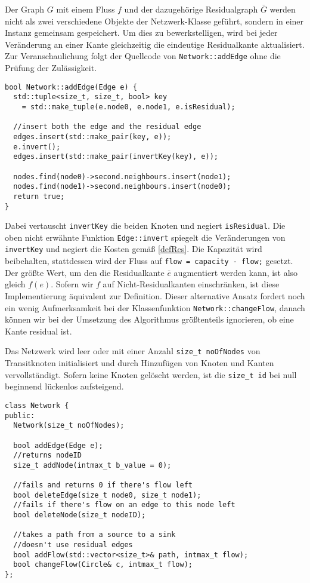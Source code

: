 Der Graph $G$ mit einem Fluss $f$ und der dazugehörige Residualgraph $\bar{G}$ werden nicht als zwei verschiedene Objekte der Netzwerk-Klasse geführt, sondern in einer Instanz gemeinsam gespeichert. Um dies zu bewerkstelligen, wird bei jeder Veränderung an einer Kante gleichzeitig die eindeutige Residualkante aktualisiert. Zur Veranschaulichung folgt der Quellcode von \lstinline|Network::addEdge| ohne die Prüfung der Zulässigkeit.

\begin{lstlisting}
bool Network::addEdge(Edge e) {
  std::tuple<size_t, size_t, bool> key
    = std::make_tuple(e.node0, e.node1, e.isResidual);

  //insert both the edge and the residual edge
  edges.insert(std::make_pair(key, e));
  e.invert();
  edges.insert(std::make_pair(invertKey(key), e));

  nodes.find(node0)->second.neighbours.insert(node1);
  nodes.find(node1)->second.neighbours.insert(node0);
  return true;
}
\end{lstlisting}

Dabei vertauscht \lstinline|invertKey| die beiden Knoten und negiert \lstinline|isResidual|. Die oben nicht erwähnte Funktion \lstinline|Edge::invert| spiegelt die Veränderungen von \lstinline|invertKey| und negiert die Kosten gemäß \cref{defRes}. Die Kapazität wird beibehalten, stattdessen wird der Fluss auf \lstinline|flow = capacity - flow;| gesetzt. Der größte Wert, um den die Residualkante $\bar{e}$ augmentiert werden kann, ist also gleich $f(e)$. Sofern wir $f$ auf Nicht-Residualkanten einschränken, ist diese Implementierung äquivalent zur Definition. Dieser alternative Ansatz fordert noch ein wenig Aufmerksamkeit bei der Klassenfunktion \lstinline|Network::changeFlow|,\footnotemark{} danach können wir bei der Umsetzung des Algorithmus größtenteils ignorieren, ob eine Kante residual ist.


Das Netzwerk wird leer oder mit einer Anzahl \lstinline|size_t noOfNodes| von Transitknoten initialisiert und durch Hinzufügen von Knoten und Kanten vervollständigt. Sofern keine Knoten gelöscht werden, ist die \lstinline|size_t id| bei null beginnend lückenlos aufsteigend.

\begin{lstlisting}
class Network {
public:
  Network(size_t noOfNodes);

  bool addEdge(Edge e);
  //returns nodeID
  size_t addNode(intmax_t b_value = 0);
  
  //fails and returns 0 if there's flow left
  bool deleteEdge(size_t node0, size_t node1);
  //fails if there's flow on an edge to this node left
  bool deleteNode(size_t nodeID);

  //takes a path from a source to a sink
  //doesn't use residual edges
  bool addFlow(std::vector<size_t>& path, intmax_t flow);
  bool changeFlow(Circle& c, intmax_t flow);
};
\end{lstlisting}

